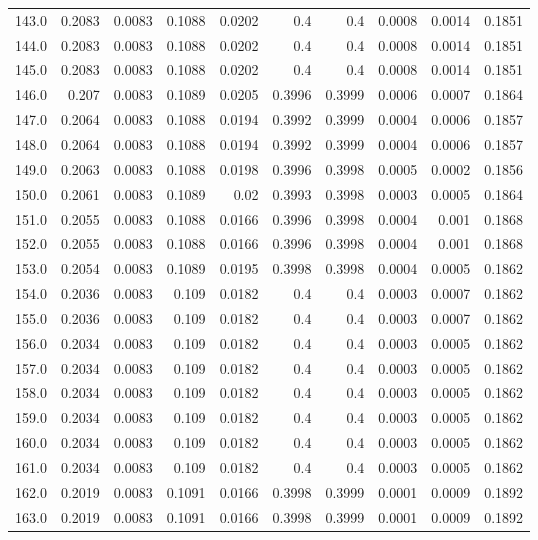 \begin{longtable}{lrrrrrrrrr}
143.0 & 0.2083 & 0.0083 & 0.1088 & 0.0202 & 0.4 & 0.4 & 0.0008 & 0.0014 & 0.1851 \\
144.0 & 0.2083 & 0.0083 & 0.1088 & 0.0202 & 0.4 & 0.4 & 0.0008 & 0.0014 & 0.1851 \\
145.0 & 0.2083 & 0.0083 & 0.1088 & 0.0202 & 0.4 & 0.4 & 0.0008 & 0.0014 & 0.1851 \\
146.0 & 0.207 & 0.0083 & 0.1089 & 0.0205 & 0.3996 & 0.3999 & 0.0006 & 0.0007 & 0.1864 \\
147.0 & 0.2064 & 0.0083 & 0.1088 & 0.0194 & 0.3992 & 0.3999 & 0.0004 & 0.0006 & 0.1857 \\
148.0 & 0.2064 & 0.0083 & 0.1088 & 0.0194 & 0.3992 & 0.3999 & 0.0004 & 0.0006 & 0.1857 \\
149.0 & 0.2063 & 0.0083 & 0.1088 & 0.0198 & 0.3996 & 0.3998 & 0.0005 & 0.0002 & 0.1856 \\
150.0 & 0.2061 & 0.0083 & 0.1089 & 0.02 & 0.3993 & 0.3998 & 0.0003 & 0.0005 & 0.1864 \\
151.0 & 0.2055 & 0.0083 & 0.1088 & 0.0166 & 0.3996 & 0.3998 & 0.0004 & 0.001 & 0.1868 \\
152.0 & 0.2055 & 0.0083 & 0.1088 & 0.0166 & 0.3996 & 0.3998 & 0.0004 & 0.001 & 0.1868 \\
153.0 & 0.2054 & 0.0083 & 0.1089 & 0.0195 & 0.3998 & 0.3998 & 0.0004 & 0.0005 & 0.1862 \\
154.0 & 0.2036 & 0.0083 & 0.109 & 0.0182 & 0.4 & 0.4 & 0.0003 & 0.0007 & 0.1862 \\
155.0 & 0.2036 & 0.0083 & 0.109 & 0.0182 & 0.4 & 0.4 & 0.0003 & 0.0007 & 0.1862 \\
156.0 & 0.2034 & 0.0083 & 0.109 & 0.0182 & 0.4 & 0.4 & 0.0003 & 0.0005 & 0.1862 \\
157.0 & 0.2034 & 0.0083 & 0.109 & 0.0182 & 0.4 & 0.4 & 0.0003 & 0.0005 & 0.1862 \\
158.0 & 0.2034 & 0.0083 & 0.109 & 0.0182 & 0.4 & 0.4 & 0.0003 & 0.0005 & 0.1862 \\
159.0 & 0.2034 & 0.0083 & 0.109 & 0.0182 & 0.4 & 0.4 & 0.0003 & 0.0005 & 0.1862 \\
160.0 & 0.2034 & 0.0083 & 0.109 & 0.0182 & 0.4 & 0.4 & 0.0003 & 0.0005 & 0.1862 \\
161.0 & 0.2034 & 0.0083 & 0.109 & 0.0182 & 0.4 & 0.4 & 0.0003 & 0.0005 & 0.1862 \\
162.0 & 0.2019 & 0.0083 & 0.1091 & 0.0166 & 0.3998 & 0.3999 & 0.0001 & 0.0009 & 0.1892 \\
163.0 & 0.2019 & 0.0083 & 0.1091 & 0.0166 & 0.3998 & 0.3999 & 0.0001 & 0.0009 & 0.1892 \\

\end{longtable}

